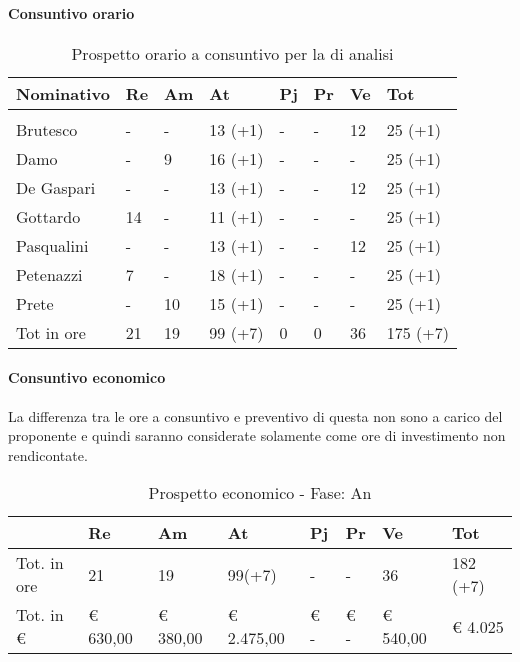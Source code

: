 			\paragraph{Consuntivo orario}
	\begin{table}[H] \begin{center} \begin{tabular}{llllllll}
	\toprule
	\textbf{Nominativo}	&	\textbf{Re}		&	\textbf{Am}		&	\textbf{At}		&	\textbf{Pj}		&	\textbf{Pr}		&	\textbf{Ve}		&	\textbf{Tot}		 \\
	\midrule																						 \\
	Brutesco	&	-		&	-		&	13	(+1)	&	-		&	-		&	12		&	25	(+1)	 \\
	Damo		&	-		&	9		&	16	(+1)	&	-		&	-		&	-		&	25	(+1) \\
	De Gaspari	&	-		&	-		&	13  (+1)	&	-		&	-		&	12		&	25	(+1) \\
	Gottardo	&	14		&	-		&	11	(+1)	&	-		&	-		&	-		&	25	(+1) \\
	Pasqualini	&	-		&	-		&	13	(+1)	&	-		&	-		&	12		&	25	(+1) \\
	Petenazzi	&	7		&	-		&	18	(+1)	&	-		&	-		&	-		&	25	(+1) \\
	Prete		&	-		&	10		&	15	(+1)	&	-		&	-		&	-		&	25	(+1) \\
	\midrule
	Tot in ore	&	21		&	19		&	99	(+7)	&	0		&	0		&	36		&	175	(+7)	 \\
	\bottomrule
	\end{tabular} \end{center} \caption{Prospetto orario a consuntivo per la  di analisi}\label{tab:oreAnalisiCons}
    \end{table}
			\paragraph{Consuntivo economico}
			La differenza tra le ore a consuntivo e preventivo di questa  non sono a carico del proponente e quindi saranno considerate solamente come ore di investimento non rendicontate.


							\begin{table}[H] \begin{center} \begin{tabular}{llllllll}
							\toprule
								&	\textbf{Re}	&	\textbf{Am}	&	\textbf{At}	&	\textbf{Pj}	&	\textbf{Pr}	&	\textbf{Ve}	&	\textbf{Tot}	 \\
							\midrule
							Tot. in ore	& 21	&	19 & 99(+7) &	-		&	-		&	36	&	182	(+7) \\
				Tot. in €	&	 €     630,00 		 & 	 €  380,00 		 & 	 €  2.475,00 		 & 	 €           -   		 & 	 €               -   		 & 	 €  540,00 		 & 	 €              4.025 		 \\
							\bottomrule
							\end{tabular} \end{center} \caption{Prospetto economico - Fase:
							An
							}\label{tab:sAnCons} \end{table}

